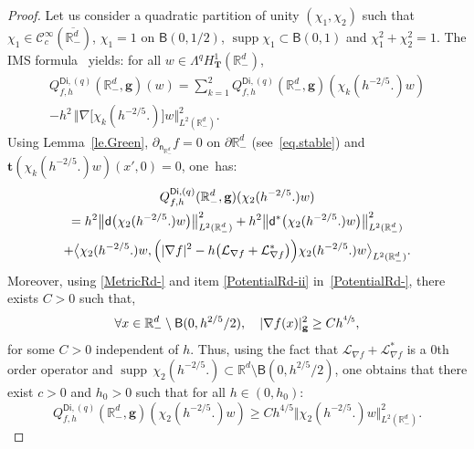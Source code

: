 \documentclass[JEP,XML,SOM,Unicode,NoEqCountersInSection,NoFloatCountersInSection,published]{cedram}
\newcommand{\mbf}[1]{\mathbf{#1}}
\let\lp\langle
\let\rp\rangle
\DeclareMathOperator\supp{supp}
\theoremstyle{plain}
\theoremstyle{definition}
\begin{document}
\begin{proof}
Let us consider a quadratic partition of unity $(\chi_1,\chi_2)$ such that
$\chi_1\in \mathcal C_c^\infty (\overline {\mathbb R_-^d})$,
$\chi_1=1$ on $\mathsf B(0,1/2)$, $\supp \chi_1\subset \mathsf
B(0,1)$ and $\chi_1^2+\chi_2^2=1$. The IMS
formula~\cite{CFKS,helffer-nier-06} yields: for all $ w\in \Lambda^qH_{\mbf T}^1(\mathbb R^d_-)$,\vspace*{-5pt}
\begin{multline}
\label{eq.IMS}
Q_{f,h}^{\mathsf{Di},(q)}(\mathbb R^d_-,\mbf g)(w) =\sum_{k=1}^2
Q_{f,h}^{\mathsf{Di},(q)}(\mathbb R^d_-,\mbf g)(\chi_k(h^{-2/5
}.)w)\\[-8pt]
- h^2\,\big \Vert \nabla\big[ \chi_k(h^{-2/5 }.) \big]w\big \Vert_{L^2(\mathbb R_-^d)}^2.
\end{multline}
Using Lemma~\ref{le.Green}, $\partial_{\mathsf n_{\mathbb
R^{d}_-}}f=0$ on $\partial \mathbb R^{d}_-$ (see~\eqref{eq.stable}) and $\mbf t (\chi_k(h^{-2/5 }.)w)(x',0)=0$, one~has:\vspace*{-5pt}
\begin{multline*}
Q_{f,h}^{\mathsf{Di},(q)}(\mathbb R^d_-,\mbf g)(\chi_2(h^{-2/5
}.)w)\\
=h^2\big \Vert \mathsf d \bigl(\chi_2(h^{-2/5 }.)w\bigr)\big \Vert_{L^2(\mathbb R^d_-)}^2 + h^2\big \Vert \mathsf d^*\bigl(\chi_2(h^{-2/5 }.)w\bigr)\big \Vert_{L^2(\mathbb R^d_-)}^2 \\
+\big \lp \chi_2(h^{-2/5 }.)w, \Bigl(\vert \nabla f\vert^2 -h\bigl(\mathcal L_{\nabla f}+\mathcal L_{\nabla f}^*\bigr)\Bigr)\chi_2(h^{-2/5 }.)w\big \rp_{L^2(\mathbb R^d_-)}.
\end{multline*}
Moreover, using \ref{MetricRd-} and item \eqref{PotentialRd-ii} in~\ref{PotentialRd-}, there exists $C>0$ such that,
\begin{equation}\label{eq.gradientup}
\forall x\in \mathbb R^d_-\setminus \mathsf B(0,h^{2/5 }/2), \quad \vert \nabla f(x)\vert^2_{{\mbf g}} \ge Ch^{\sfrac 45},
\end{equation}
for some $C>0$ independent of $h$. Thus, using the fact that $\mathcal L_{\nabla f}+\mathcal L_{\nabla f}^*$ is a $0$th order operator and $\supp\, \chi_2(h^{-2/5 }.)\subset \mathbb R^d\setminus \mathsf B(0,h^{2/5 }/2)$, one obtains that there exist $c>0$ and $h_0>0$ such that for all $h\in (0,h_0)$:
\begin{equation}\label{eq.chi_2-Q}
Q_{f,h}^{\mathsf{Di},(q)}(\mathbb R^d_-,\mbf g)(\chi_2(h^{-2/5 }.)w)\ge Ch^{4/5} \Vert \chi_2(h^{-2/5 }.) w \Vert_{L^2(\mathbb R_-^d)}^2.
\end{equation}

\end{proof}
\end{document}
